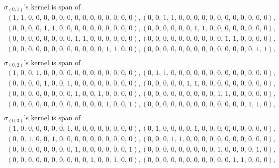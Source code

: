 \documentclass[8pt]{article}\usepackage{amsmath}
\begin{document}
\( \sigma_{(0, 1)}\)'s kernel is span of   
\begin{align*} \left(1,\,1,\,0,\,0,\,0,\,0,\,0,\,0,\,0,\,0,\,0,\,0,\,0,\,0,\,0,\,0\right) , \left(0,\,0,\,1,\,1,\,0,\,0,\,0,\,0,\,0,\,0,\,0,\,0,\,0,\,0,\,0,\,0\right) , \\ 
 \left(0,\,0,\,0,\,0,\,1,\,1,\,0,\,0,\,0,\,0,\,0,\,0,\,0,\,0,\,0,\,0\right) , \left(0,\,0,\,0,\,0,\,0,\,0,\,1,\,1,\,0,\,0,\,0,\,0,\,0,\,0,\,0,\,0\right) , \\ 
 \left(0,\,0,\,0,\,0,\,0,\,0,\,0,\,0,\,1,\,1,\,0,\,0,\,0,\,0,\,0,\,0\right) , \left(0,\,0,\,0,\,0,\,0,\,0,\,0,\,0,\,0,\,0,\,1,\,1,\,0,\,0,\,0,\,0\right) , \\ 
 \left(0,\,0,\,0,\,0,\,0,\,0,\,0,\,0,\,0,\,0,\,0,\,0,\,1,\,1,\,0,\,0\right) , \left(0,\,0,\,0,\,0,\,0,\,0,\,0,\,0,\,0,\,0,\,0,\,0,\,0,\,0,\,1,\,1\right) , \\ \end{align*}
\( \sigma_{(0, 2)}\)'s kernel is span of   
\begin{align*} \left(1,\,0,\,0,\,1,\,0,\,0,\,0,\,0,\,0,\,0,\,0,\,0,\,0,\,0,\,0,\,0\right) , \left(0,\,1,\,1,\,0,\,0,\,0,\,0,\,0,\,0,\,0,\,0,\,0,\,0,\,0,\,0,\,0\right) , \\ 
 \left(0,\,0,\,0,\,0,\,1,\,0,\,0,\,1,\,0,\,0,\,0,\,0,\,0,\,0,\,0,\,0\right) , \left(0,\,0,\,0,\,0,\,0,\,1,\,1,\,0,\,0,\,0,\,0,\,0,\,0,\,0,\,0,\,0\right) , \\ 
 \left(0,\,0,\,0,\,0,\,0,\,0,\,0,\,0,\,1,\,0,\,0,\,1,\,0,\,0,\,0,\,0\right) , \left(0,\,0,\,0,\,0,\,0,\,0,\,0,\,0,\,0,\,1,\,1,\,0,\,0,\,0,\,0,\,0\right) , \\ 
 \left(0,\,0,\,0,\,0,\,0,\,0,\,0,\,0,\,0,\,0,\,0,\,0,\,1,\,0,\,0,\,1\right) , \left(0,\,0,\,0,\,0,\,0,\,0,\,0,\,0,\,0,\,0,\,0,\,0,\,0,\,1,\,1,\,0\right) , \\ \end{align*}
\( \sigma_{(0, 3)}\)'s kernel is span of   
\begin{align*} \left(1,\,0,\,0,\,0,\,0,\,0,\,0,\,1,\,0,\,0,\,0,\,0,\,0,\,0,\,0,\,0\right) , \left(0,\,1,\,0,\,0,\,0,\,0,\,1,\,0,\,0,\,0,\,0,\,0,\,0,\,0,\,0,\,0\right) , \\ 
 \left(0,\,0,\,1,\,0,\,0,\,1,\,0,\,0,\,0,\,0,\,0,\,0,\,0,\,0,\,0,\,0\right) , \left(0,\,0,\,0,\,1,\,1,\,0,\,0,\,0,\,0,\,0,\,0,\,0,\,0,\,0,\,0,\,0\right) , \\ 
 \left(0,\,0,\,0,\,0,\,0,\,0,\,0,\,0,\,1,\,0,\,0,\,0,\,0,\,0,\,0,\,1\right) , \left(0,\,0,\,0,\,0,\,0,\,0,\,0,\,0,\,0,\,1,\,0,\,0,\,0,\,0,\,1,\,0\right) , \\ 
 \left(0,\,0,\,0,\,0,\,0,\,0,\,0,\,0,\,0,\,0,\,1,\,0,\,0,\,1,\,0,\,0\right) , \left(0,\,0,\,0,\,0,\,0,\,0,\,0,\,0,\,0,\,0,\,0,\,1,\,1,\,0,\,0,\,0\right) , \\ \end{align*}
\end{document}
